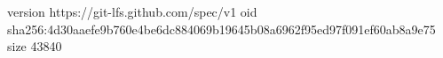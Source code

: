 version https://git-lfs.github.com/spec/v1
oid sha256:4d30aaefe9b760e4be6dc884069b19645b08a6962f95ed97f091ef60ab8a9e75
size 43840
